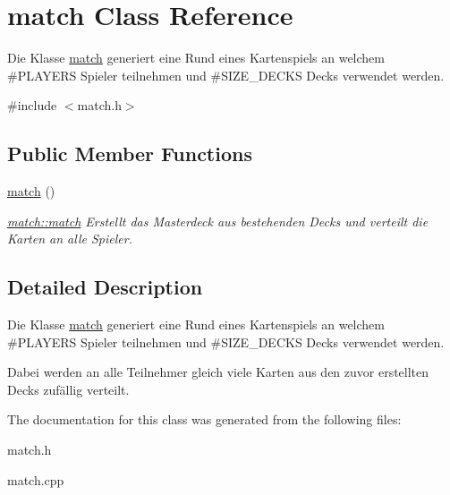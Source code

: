 \hypertarget{classmatch}{\section{match Class Reference}
\label{classmatch}
}


Die Klasse \hyperlink{classmatch}{match} generiert eine Rund eines Kartenspiels an welchem \#\-P\-L\-A\-Y\-E\-R\-S Spieler teilnehmen und \#\-S\-I\-Z\-E\-\_\-\-D\-E\-C\-K\-S Decks verwendet werden.  




{\ttfamily \#include $<$match.\-h$>$}

\subsection*{Public Member Functions}
\begin{DoxyCompactItemize}
\item 
\hypertarget{classmatch_a324c10417644283bb7101859392ed252}{\hyperlink{classmatch_a324c10417644283bb7101859392ed252}{match} ()}\label{classmatch_a324c10417644283bb7101859392ed252}

\begin{DoxyCompactList}\small\item\em \hyperlink{classmatch_a324c10417644283bb7101859392ed252}{match\-::match} Erstellt das Masterdeck aus bestehenden Decks und verteilt die Karten an alle Spieler. \end{DoxyCompactList}\end{DoxyCompactItemize}


\subsection{Detailed Description}
Die Klasse \hyperlink{classmatch}{match} generiert eine Rund eines Kartenspiels an welchem \#\-P\-L\-A\-Y\-E\-R\-S Spieler teilnehmen und \#\-S\-I\-Z\-E\-\_\-\-D\-E\-C\-K\-S Decks verwendet werden. 

Dabei werden an alle Teilnehmer gleich viele Karten aus den zuvor erstellten Decks zufällig verteilt. 

The documentation for this class was generated from the following files\-:\begin{DoxyCompactItemize}
\item 
match.\-h\item 
match.\-cpp\end{DoxyCompactItemize}
